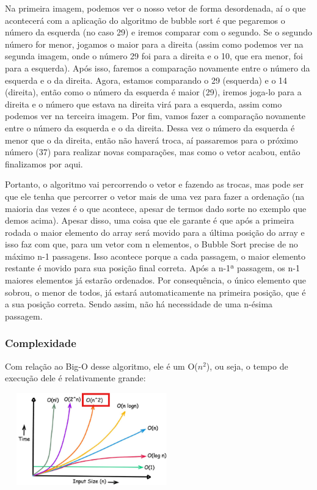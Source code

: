 \documentclass{report}
\begin{document}
	Na primeira imagem, podemos ver o nosso vetor de forma desordenada, aí o que acontecerá com a aplicação do algoritmo de bubble sort é que pegaremos o número da esquerda (no caso 29) e iremos comparar com o segundo. Se o segundo número for menor, jogamos o maior para a direita (assim como podemos ver na segunda imagem, onde o número 29 foi para a direita e o 10, que era menor, foi para a esquerda). Após isso, faremos a comparação novamente entre o número da esquerda e o da direita. Agora, estamos comparando o 29 (esquerda) e o 14 (direita), então como o número da esquerda é maior (29), iremos joga-lo para a direita e o número que estava na direita virá para a esquerda, assim como podemos ver na terceira imagem. Por fim, vamos fazer a comparação novamente entre o número da esquerda e o da direita. Dessa vez o número da esquerda é menor que o da direita, então não haverá troca, aí passaremos para o próximo número (37) para realizar novas comparações, mas como o vetor acabou, então finalizamos por aqui.
	
	Portanto, o algoritmo vai percorrendo o vetor e fazendo as trocas, mas pode ser que ele tenha que percorrer o vetor mais de uma vez para fazer a ordenação (na maioria das vezes é o que acontece, apesar de termos dado sorte no exemplo que demos acima). Apesar disso, uma coisa que ele garante é que após a primeira rodada o maior elemento do array será movido para a última posição do array e isso faz com que, para um vetor com n elementos, o Bubble Sort precise de no máximo n-1 passagens. Isso acontece porque a cada passagem, o maior elemento restante é movido para sua posição final correta. Após a n-1ª passagem, os n-1 maiores elementos já estarão ordenados. Por consequência, o único elemento que sobrou, o menor de todos, já estará automaticamente na primeira posição, que é a sua posição correta. Sendo assim, não há necessidade de uma n-ésima passagem.
	
	
	\subsubsection{Complexidade}
	Com relação ao Big-O desse algoritmo, ele é um O($n^{2}$), ou seja, o tempo de execução dele é relativamente grande:
	
	\begin{center}
		
		\includegraphics[width=7.5cm,height=4cm,keepaspectratio=false]{imagens/bubble_comple.png}
		
	\end{center}
	
\end{document}

